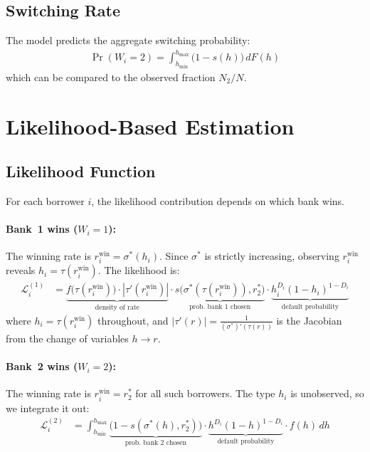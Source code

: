 \documentclass[12pt]{article}
\theoremstyle{plain}
\theoremstyle{plain}
\theoremstyle{definition}  %
\theoremstyle{remark}  %
\begin{document}
\subsection{Switching Rate}

The model predicts the aggregate switching probability:
\begin{align*}
    \Pr(W_i = 2) = \int_{h_{\min}}^{h_{\max}} \big(1-s(h)\big)\, dF(h)
\end{align*}
which can be compared to the observed fraction $N_2/N$.


\section{Likelihood-Based Estimation}\label{sec:estimation}

\subsection{Likelihood Function}

For each borrower $i$, the likelihood contribution depends on which bank wins.

\paragraph{Bank~1 wins ($W_i = 1$):} The winning rate is $r_i^{\text{win}} = \sigma^*(h_i)$. Since $\sigma^*$ is strictly increasing, observing $r_i^{\text{win}}$ reveals $h_i = \tau(r_i^{\text{win}})$. The likelihood is:
\begin{align}\label{eq:L1}
    \mathcal{L}_i^{(1)} &= \underbrace{f\!\big(\tau(r_i^{\text{win}})\big) \cdot |\tau'(r_i^{\text{win}})|}_{\text{density of rate}} \cdot \underbrace{s\!\big(\sigma^*(\tau(r_i^{\text{win}})), r_2^*\big)}_{\text{prob.\ bank~1 chosen}} \cdot \underbrace{h_i^{D_i}(1-h_i)^{1-D_i}}_{\text{default probability}}
\end{align}
where $h_i = \tau(r_i^{\text{win}})$ throughout, and $|\tau'(r)| = \frac{1}{(\sigma^*)'(\tau(r))}$ is the Jacobian from the change of variables $h \to r$.

\paragraph{Bank~2 wins ($W_i = 2$):} The winning rate is $r_i^{\text{win}} = r_2^*$ for all such borrowers. The type $h_i$ is unobserved, so we integrate it out:
\begin{align}\label{eq:L2}
    \mathcal{L}_i^{(2)} &= \int_{h_{\min}}^{h_{\max}} \underbrace{\big(1-s(\sigma^*(h), r_2^*)\big)}_{\text{prob.\ bank~2 chosen}} \cdot \underbrace{h^{D_i}(1-h)^{1-D_i}}_{\text{default probability}} \cdot f(h)\, dh
\end{align}
\end{document}
